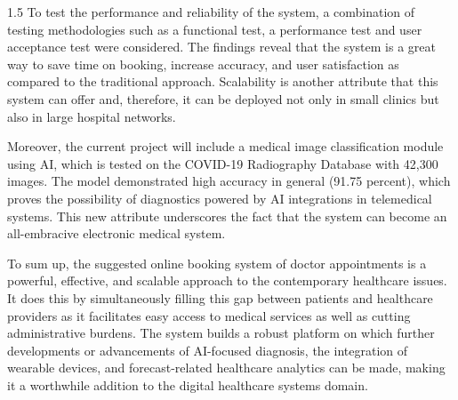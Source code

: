 \begin{spacing}{1.5}
To test the performance and reliability of the system, a combination of testing methodologies such as a functional test, a performance test and user acceptance test were considered. The findings reveal that the system is a great way to save time on booking, increase accuracy, and user satisfaction as compared to the traditional approach. Scalability is another attribute that this system can offer and, therefore, it can be deployed not only in small clinics but also in large hospital networks.

Moreover, the current project will include a medical image classification module using AI, which is tested on the COVID-19 Radiography Database with 42,300 images. The model demonstrated high accuracy in general (91.75 percent), which proves the possibility of diagnostics powered by AI integrations in telemedical systems. This new attribute underscores the fact that the system can become an all-embracive electronic medical system.

To sum up, the suggested online booking system of doctor appointments is a powerful, effective, and scalable approach to the contemporary healthcare issues. It does this by simultaneously filling this gap between patients and healthcare providers as it facilitates easy access to medical services as well as cutting administrative burdens. The system builds a robust platform on which further developments or advancements of AI-focused diagnosis, the integration of wearable devices, and forecast-related healthcare analytics can be made, making it a worthwhile addition to the digital healthcare systems domain.
\end{spacing}
